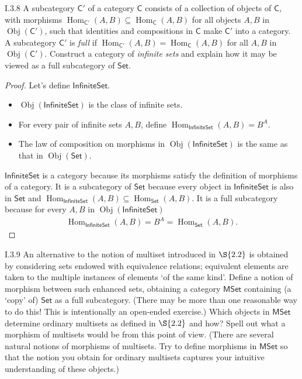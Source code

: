 \begin{exercise}{I.3.8}
	A subcategory $\mathsf{C}'$ of a category $\mathsf{C}$ consists of a collection of objects of $\mathsf{C}$, with morphisms $\operatorname{Hom}_{\mathsf{C}'}(A, B) \subseteq \operatorname{Hom}_{\mathsf{C}}(A, B)$ for all objects $A, B$ in $\operatorname{Obj}(\mathsf{C}')$, such that identities and compositions in $\mathsf{C}$ make $\mathsf{C}'$ into a category. A subcategory $\mathsf{C}'$ is \textit{full} if $\operatorname{Hom}_{\mathsf{C}'}(A, B) = \operatorname{Hom}_{\mathsf{C}}(A, B)$ for all $A, B$ in $\operatorname{Obj}(\mathsf{C}')$. Construct a category of \textit{infinite sets} and explain how it may be viewed as a full subcategory of $\mathsf{Set}$.
\end{exercise}

\begin{proof}
	Let's define $\mathsf{InfiniteSet}$.
	\begin{itemize}
		\item $\operatorname{Obj}(\mathsf{InfiniteSet})$ is the class of infinite sets.
		\item For every pair of infinite sets $A, B$, define $\operatorname{Hom}_{\mathsf{InfiniteSet}}(A, B) = B^{A}$.
		\item The law of composition on morphisms in $\operatorname{Obj}(\mathsf{InfiniteSet})$ is the same as that in $\operatorname{Obj}(\mathsf{Set})$.
	\end{itemize}

	$\mathsf{InfiniteSet}$ is a category because its morphisms satisfy the definition of morphisms of a category. It is a subcategory of $\mathsf{Set}$ because every object in $\mathsf{InfiniteSet}$ is also in $\mathsf{Set}$ and $\operatorname{Hom}_{\mathsf{InfiniteSet}}(A, B)\subseteq \operatorname{Hom}_{\mathsf{Set}}(A, B)$. It is a full subcategory because for every $A, B$ in $\operatorname{Obj}(\mathsf{InfiniteSet})$
	\begin{align*}
		\operatorname{Hom}_{\mathsf{InfiniteSet}}(A, B) = B^{A} = \operatorname{Hom}_{\mathsf{Set}}(A, B).
	\end{align*}
\end{proof}

\begin{exercise}{I.3.9}\label{exercise:I.3.9}
	An alternative to the notion of multiset introduced in $\S{2.2}$ is obtained by considering sets endowed with equivalence relations; equivalent elements are taken to the multiple instances of elements `of the same kind'. Define a notion of morphism between such enhanced sets, obtaining a category $\mathsf{MSet}$ containing (a `copy' of) $\mathsf{Set}$ as a full subcategory. (There may be more than one reasonable way to do this! This is intentionally an open-ended exercise.) Which objects in $\mathsf{MSet}$ determine ordinary multisets as defined in $\S{2.2}$ and how? Spell out what a morphism of multisets would be from this point of view. (There are several natural notions of morphisms of multisets. Try to define morphisms in $\mathsf{MSet}$ so that the notion you obtain for ordinary multisets captures your intuitive understanding of these objects.)
\end{exercise}

